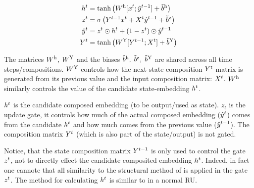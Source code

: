 \documentclass[12pt,parskip]{komatufte}
\begin{document}
\begin{align}
\n h_t &= \tanh\left(\d W_h [\n x_t; \n \hat{y}_{t-1}] + \dv b_h \right)\\
\n z_t &= \sigma\left(\n Y_{t-1} \n x_t + \n X_t \n \hat{y}_{t-1} + \dv b_z \right)\\
%
\n \hat{y}_t &= \n z_t \odot \n h_t + (1 - \n z_t) \odot \n \hat{y}_{t-1} \\
\n Y_t &= \tanh \left( \d W_Y [\n Y_{t-1}; \n X_t] + \dv b_Y \right)
\end{align}



The matrices $\d W_h$, $\d W_Y$ and the biases $\dv b_h,\; \dv b_z,\; \dv b_Y$ are shared across all time steps/compositions.
$\d W_Y$ controls how the next state-composition $\n Y_t$ matrix is generated from its previous value and the input composition matrix: $\n X_t$.
$\d W_h$ similarly controls the value of the candidate state-embedding $\n h_t$.

$\n h_t$ is the candidate composed embedding (to be output/used as state).
$z_t$ is the update gate, it controls how much of the actual composed embedding ($\n \hat{y}_t$) comes from the candidate $\n h_t$ and how much comes from the previous value ($\n \hat{y}_{t-1}$).
The composition matrix $\n Y_t$ (which is also part of the state/output) is not gated.

Notice, that the state composition matrix $\n Y_{t-1}$ is only used to control the gate $\n z_t$, not to directly effect the candidate composited embedding $\n h_t$.
Indeed, in fact one cannote that all similarity to the structural method of \textcite{SocherMVRNN} is applied in the gate $\n z_t$.
The method for calculating $\n h_t$ is similar to in a normal RU.
\end{document}
